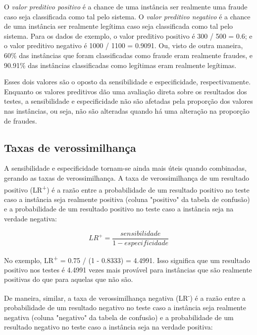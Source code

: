 O \emph{valor preditivo positivo} é a chance de uma instância ser realmente uma fraude caso seja classificada como tal pelo sistema. O \emph{valor preditivo negativo} é a chance de uma instância ser realmente legítima caso seja classificada como tal pelo sistema. Para os dados de exemplo, o valor preditivo positivo é 300 / 500 = 0.6; e o valor preditivo negativo é 1000 / 1100 = 0.9091. Ou, visto de outra maneira, 60\% das instâncias que foram classificadas como fraude eram realmente fraudes, e 90.91\% das instâncias classificadas como legítimas eram realmente legítimas.

Esses dois valores são o oposto da sensibilidade e especificidade, respectivamente. Enquanto os valores preditivos dão uma avaliação direta sobre os resultados dos testes, a sensibilidade e especificidade não são afetadas pela proporção dos valores nas instâncias, ou seja, não são alteradas quando há uma alteração na proporção de fraudes.

\subsection{Taxas de verossimilhança}

A sensibilidade e especificidade tornam-se ainda mais úteis quando combinadas, gerando as taxas de verossimilhança. A taxa de verossimilhança de um resultado positivo (LR\textsuperscript{+}) é a razão entre a probabilidade de um resultado positivo no teste caso a instância seja realmente positiva (coluna "positivo" da tabela de confusão) e a probabilidade de um resultado positivo no teste caso a instância seja na verdade negativa:

\vspace{2mm}
\begin{equation}
    LR^{+}=\frac{sensibilidade}{1 - especificidade}
\end{equation}
\vspace{2mm}

No exemplo, LR\textsuperscript{+} = 0.75 / (1 - 0.8333) = 4.4991. Isso significa que um resultado positivo nos testes é 4.4991 vezes mais provável para instâncias que são realmente positivas do que para aquelas que não são.

De maneira, similar, a taxa de verossimilhança negativa (LR\textsuperscript{-}) é a razão entre a probabilidade de um resultado negativo no teste caso a instância seja realmente negativa (coluna "negativo" da tabela de confusão) e a probabilidade de um resultado negativo no teste caso a instância seja na verdade positiva:

